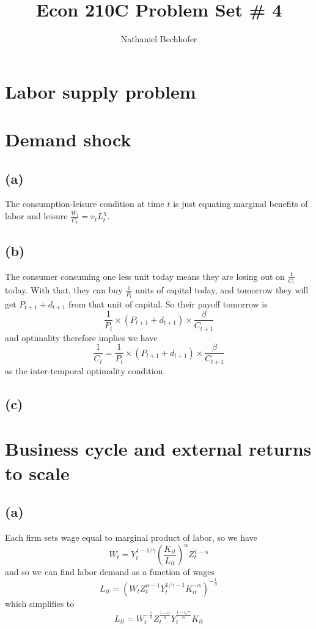 \documentclass[11pt]{amsart}
\title{Econ 210C Problem Set \# 4}
\author{Nathaniel Bechhofer}
\begin{document}
\maketitle

\section{Labor supply problem}
\section{Demand shock}

\subsection*{(a)}

The consumption-leisure condition at time $t$ is just equating marginal benefits of labor and leisure $\frac{W_t}{C_t} = v_t L_t^\chi$.

\subsection*{(b)}

The consumer consuming one less unit today means they are losing out on $\frac{1}{C_t}$ today. 
With that, they can buy $\frac{1}{P_t}$ units of capital today, and tomorrow they will get $P_{t+1} + d_{t+1}$ from that unit of capital. 
So their payoff tomorrow is 
\[
\frac{1}{P_t} \times (P_{t+1} + d_{t+1}) \times \frac{\beta}{C_{t+1}}
\]
and optimality therefore implies we have
\[
\frac{1}{C_t} = \frac{1}{P_t} \times (P_{t+1} + d_{t+1}) \times \frac{\beta}{C_{t+1}}
\]
as the inter-temporal optimality condition.

\subsection*{(c)}



\section{Business cycle and external returns to scale}

\subsection*{(a)}

Each firm sets wage equal to marginal product of labor, so we have
\[
W_t = Y_t^{1-1/\gamma} \left(\frac{K_{it}}{L_{it}}\right)^{\alpha} Z_t^{1-\alpha}
\]
and so we can find labor demand as a function of wages
\[
L_{it} = (W_t Z_t^{\alpha-1} Y_t^{1/\gamma -1} K_{it}^{-\alpha})^{-\frac{1}{\alpha}}
\]
which simplifies to
\[
L_{it} = W_t^{-\frac{1}{\alpha}} Z_t^{\frac{1-\alpha}{\alpha}} Y_t^{\frac{1-1/\gamma}{\alpha}} K_{it}
\]
\end{document}
